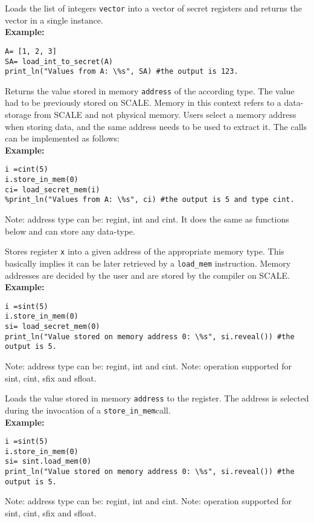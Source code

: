 Loads the list of integers \verb|vector| into a vector of secret registers and returns the vector in a single instance.\\
\textbf{Example:}
\begin{lstlisting}
A= [1, 2, 3]
SA= load_int_to_secret(A)
print_ln("Values from A: \%s", SA) #the output is 123.
\end{lstlisting}


Returns the value stored in memory \verb|address| of the according type. The value had to be previously stored on SCALE. Memory in this context refers to a data-storage from SCALE and not physical memory. Users select a memory address when storing data, and the same address needs to be used to extract it. The calls can be implemented as follows: \\
\textbf{Example:}
\begin{lstlisting}
i =cint(5)
i.store_in_mem(0)
ci= load_secret_mem(i)
%print_ln("Values from A: \%s", ci) #the output is 5 and type cint.
\end{lstlisting}
\begin{footnotesize}
Note: address type can be: regint, int and cint. It does the same as functions below and can store any data-type.
\end{footnotesize}

Stores register \verb|x| into a given address
of the appropriate memory type. This basically implies it can be later retrieved by a \verb|load_mem| instruction. Memory addresses are decided by the user and are  stored by the compiler on SCALE. \\
\textbf{Example:}
\begin{lstlisting}
i =sint(5)
i.store_in_mem(0)
si= load_secret_mem(0)
print_ln("Value stored on memory address 0: \%s", si.reveal()) #the output is 5.
\end{lstlisting}
\begin{footnotesize}
Note: address type can be: regint, int and cint.
Note: operation supported for sint, cint, sfix and sfloat.
\end{footnotesize}

Loads the value stored in memory \verb|address| to the register. The address is selected during the invocation of a \verb|store_in_mem|call. \\
\textbf{Example:}
\begin{lstlisting}
i =sint(5)
i.store_in_mem(0)
si= sint.load_mem(0)
print_ln("Value stored on memory address 0: \%s", si.reveal()) #the output is 5.
\end{lstlisting}
\begin{footnotesize}
Note: address type can be: regint, int and cint.
Note: operation supported for sint, cint, sfix and sfloat.
\end{footnotesize}


